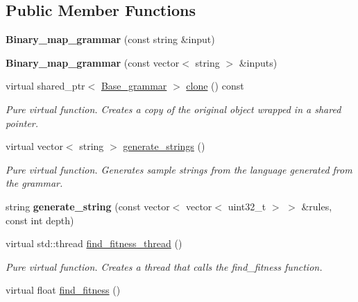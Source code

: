 \subsection*{Public Member Functions}
\begin{DoxyCompactItemize}
\item 
\mbox{\label{classBinary__map__grammar_a891615d1d11c0ebdbe1a9432a701e4f8}} 
{\bfseries Binary\+\_\+map\+\_\+grammar} (const string \&input)
\item 
\mbox{\label{classBinary__map__grammar_aba1617bd700632892b435ba780f1cc1f}} 
{\bfseries Binary\+\_\+map\+\_\+grammar} (const vector$<$ string $>$ \&inputs)
\item 
virtual shared\+\_\+ptr$<$ \mbox{\hyperlink{classBase__grammar}{Base\+\_\+grammar}} $>$ \mbox{\hyperlink{classBinary__map__grammar_a701a7d073e76cea7dfedfbd514c3fac7}{clone}} () const
\begin{DoxyCompactList}\small\item\em Pure virtual function. Creates a copy of the original object wrapped in a shared pointer. \end{DoxyCompactList}\item 
virtual vector$<$ string $>$ \mbox{\hyperlink{classBinary__map__grammar_adf7b6f59466f209246cb5f816b9cb68d}{generate\+\_\+strings}} ()
\begin{DoxyCompactList}\small\item\em Pure virtual function. Generates sample strings from the language generated from the grammar. \end{DoxyCompactList}\item 
\mbox{\label{classBinary__map__grammar_a2a9b92c40c9103bd215857e615ecffcb}} 
string {\bfseries generate\+\_\+string} (const vector$<$ vector$<$ uint32\+\_\+t $>$ $>$ \&rules, const int depth)
\item 
virtual std\+::thread \mbox{\hyperlink{classBinary__map__grammar_a331b929d28960fb4fda2bf9f863349f1}{find\+\_\+fitness\+\_\+thread}} ()
\begin{DoxyCompactList}\small\item\em Pure virtual function. Creates a thread that calls the find\+\_\+fitness function. \end{DoxyCompactList}\item 
virtual float \mbox{\hyperlink{classBinary__map__grammar_ac582d7d468099817506ae54b346de08d}{find\+\_\+fitness}} ()

\end{DoxyCompactItemize}
